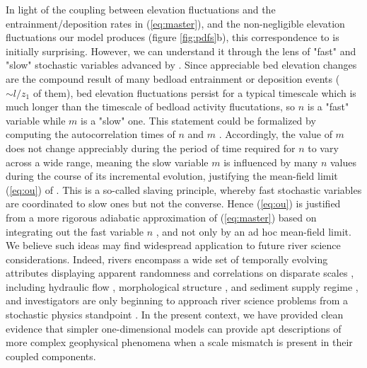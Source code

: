\documentclass[draft]{agujournal2018}
\begin{document}
In light of the coupling between elevation fluctuations and the entrainment/deposition rates in (\ref{eq:master}), and the non-negligible elevation fluctuations our model produces (figure \ref{fig:pdfs}b), this correspondence to \citet{Martin2014} is initially surprising.
However, we can understand it through the lens of "fast" and "slow" stochastic variables advanced by \citet{Haken1983}.
Since appreciable bed elevation changes are the compound result of many bedload entrainment or deposition events ($\sim l/z_1$ of them), bed elevation fluctuations persist for a typical timescale which is much longer than the timescale of bedload activity flucutations, so $n$ is a "fast" variable while $m$ is a "slow" one.
This statement could be formalized by computing the autocorrelation times of $n$ and $m$ \citep[e.g.][]{Gardiner1983}.
Accordingly, the value of $m$ does not change appreciably during the period of time required for $n$ to vary across a wide range, meaning the slow variable $m$ is influenced by many $n$ values during the course of its incremental evolution, justifying the mean-field limit (\ref{eq:ou}) of \citet{Martin2014}.
This is a so-called slaving principle, whereby fast stochastic variables are coordinated to slow ones but not the converse.
Hence (\ref{eq:ou}) is justified from a more rigorous adiabatic approximation of (\ref{eq:master}) based on integrating out the fast variable $n$ \citep[e.g.][]{Haken1983}, and not only by an ad hoc mean-field limit.
We believe such ideas may find widespread application to future river science considerations.
Indeed, rivers encompass a wide set of temporally evolving attributes displaying apparent randomness and correlations on disparate scales \citep{Chartrand2019}, including hydraulic flow \citep[e.g.][]{Ferrer-Boix2015}, morphological structure \citep[e.g.][]{Dhont2018}, and sediment supply regime \citep[e.g.][]{Elgueta-Astaburuaga2019}, and investigators are only beginning to approach river science problems from a stochastic physics standpoint \citep[e.g][]{Ancey2008,Furbish2012}.
In the present context, we have provided clean evidence that simpler one-dimensional models \citep[e.g.][]{Martin2014} can provide apt descriptions of more complex geophysical phenomena when a scale mismatch is present in their coupled components.
\end{document}
